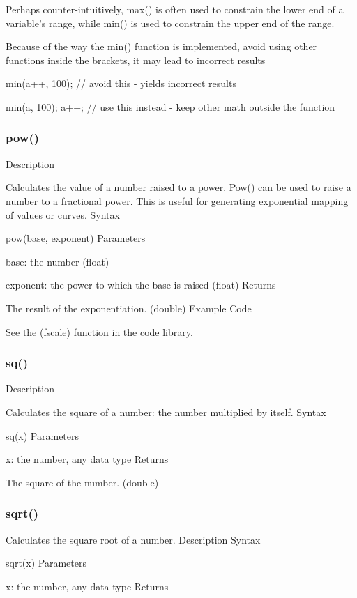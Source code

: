 \documentclass[12pt,a4paper]{report}  %
\begin{document}
Perhaps counter-intuitively, max() is often used to constrain the lower end of a variable’s range, while min() is used to constrain the upper end of the range.

Because of the way the min() function is implemented, avoid using other functions inside the brackets, it may lead to incorrect results

min(a++, 100);   // avoid this - yields incorrect results

min(a, 100);
a++;    // use this instead - keep other math outside the function

\subsubsection{pow()}\label{pow}

Description

Calculates the value of a number raised to a power. Pow() can be used to raise a number to a fractional power. This is useful for generating exponential mapping of values or curves.
Syntax

pow(base, exponent)
Parameters

base: the number (float)

exponent: the power to which the base is raised (float)
Returns

The result of the exponentiation. (double)
Example Code

See the (fscale) function in the code library.

\subsubsection{sq()}\label{sq}

Description

Calculates the square of a number: the number multiplied by itself.
Syntax

sq(x)
Parameters

x: the number, any data type
Returns

The square of the number. (double)

\subsubsection{sqrt()}\label{sqrt}

Calculates the square root of a number.
Description
Syntax

sqrt(x)
Parameters

x: the number, any data type
Returns
\end{document}
